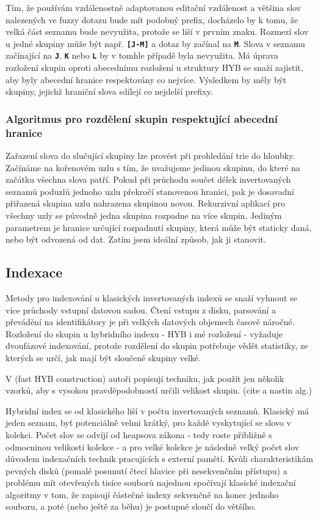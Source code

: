 \documentclass[11pt,letterpaper,oneside,openright]{book}
\newcommand{\bftt}[1]{\texttt{\textbf{#1}}}
\begin{document}
Tím, že používám vzdálenostně adaptovanou editační vzdálenost a většina slov
nalezených ve fuzzy dotazu bude mít podobný prefix, docházelo by k tomu, že
velká část seznamu bude nevyužita, protože se liší v prvním znaku. Rozmezí slov
u jedné skupiny může být např. \bftt{[J-M]} a dotaz by začínal na \bftt{M}. Slova v
seznamu začínající na \bftt{J}, \bftt{K} nebo \bftt{L} by v tomhle případě byla
nevyužita. Má úprava rozložení skupin oproti abecednímu rozložení u struktury
HYB se snaží zajistit, aby byly abecední hranice respektovány co nejvíce.
Výsledkem by měly být skupiny, jejichž hraniční slova sdílejí co nejdelší
prefixy.

\subsubsection{Algoritmus pro rozdělení skupin respektující abecední hranice}
Zařazení slova do slučující skupiny lze provést při prohledání trie do hloubky.
Začínáme na kořenovém uzlu s tím, že uvažujeme jedinou skupinu, do které na
začátku všechna slova patří. Pokud při průchodu součet délek invertovaných
seznamů poduzlů jednoho uzlu překročí stanovenou hranici, pak je dosavadní
přiřazená skupina uzlu nahrazena skupinou novou. Rekurzivní aplikací pro
všechny uzly se původně jedna skupina rozpadne na více skupin. Jediným
parametrem je hranice určující rozpadnutí skupiny, která může být staticky
daná, nebo být odvozená od dat. Zatím jsem ideální způsob, jak ji stanovit.


\subsection{Indexace}
Metody pro indexování u klasických invertovaných indexů se snaží vyhnout se
více průchody vstupní datovou sadou. Čtení vstupu z disku, parsování a
převádění na identifikátory je při velkých datových objemech časově náročné.
Rozložení do skupin u hybridního indexu - HYB i mé rozložení - vyžaduje
dvoufázové indexování, protože rozdělení do skupin potřebuje vědět statistiky,
ze kterých se určí, jak mají být sloučené skupiny velké.

V (fast HYB construction) autoři popisují techniku, jak použít jen několik
vzorků, aby s vysokou pravděpodobností určili velikost skupin. (cite a nastin
alg.)

Hybridní index se od klasického liší v počtu invertovaných seznamů. Klasický má
jeden seznam, byť potenciálně velmi krátký, pro každé vyskytující se slovo v
kolekci. Počet slov se odvíjí od heapsova zákona - tedy roste přibližně s
odmocninou velikosti kolekce - a pro velké kolekce je následně velký počet slov
důvodem indexačních technik pracujících s externí pamětí. Kvůli
charakteristikám pevných disků (pomalé posunutí čtecí hlavice při nesekvenčním
přístupu) a problému mít otevřených tisíce souborů najednou spočívají klasické
indexační algoritmy v tom, že zapisují částečné indexy sekvenčně na konec
jednoho souboru, a poté (nebo ještě za běhu) je postupně sloučí do většího.
\end{document}
